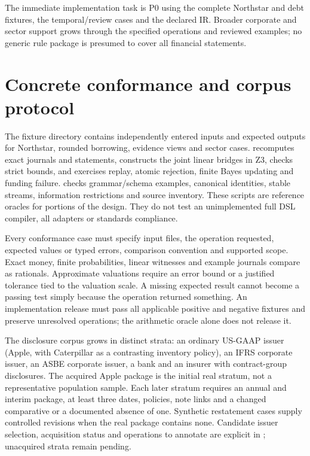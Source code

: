 The immediate implementation task is P0 using the complete Northstar and debt
fixtures, the temporal/review cases and the declared IR. Broader corporate and
sector support grows through the specified operations and reviewed examples;
no generic rule package is presumed to cover all financial statements.

\section{Concrete conformance and corpus protocol}

The fixture directory contains independently entered inputs and expected
outputs for Northstar, rounded borrowing, evidence views and sector cases.
 recomputes exact journals and statements,
constructs the joint linear bridges in Z3, checks strict bounds, and exercises
replay, atomic rejection, finite Bayes updating and funding failure.
 checks grammar/schema examples, canonical
identities, stable streams, information restrictions and source inventory.
These scripts are reference oracles for portions of the design. They do not
test an unimplemented full DSL compiler, all adapters or standards compliance.

Every conformance case must specify input files, the operation requested,
expected values or typed errors, comparison convention and supported scope.
Exact money, finite probabilities, linear witnesses and example journals
compare as rationals. Approximate valuations require an error bound or a
justified tolerance tied to the valuation scale. A missing expected result
cannot become a passing test simply because the operation returned something.
An implementation release must pass all applicable positive and negative
fixtures and preserve unresolved operations; the arithmetic oracle alone
does not release it.

The disclosure corpus grows in distinct strata: an ordinary US-GAAP issuer
(Apple, with Caterpillar as a contrasting inventory policy), an IFRS corporate
issuer, an ASBE corporate issuer, a bank and an insurer with contract-group
disclosures. The acquired Apple package is the initial real stratum, not a
representative population sample. Each later stratum requires an annual and
interim package, at least three dates, policies, note links and a changed
comparative or a documented absence of one. Synthetic restatement cases supply
controlled revisions when the real package contains none. Candidate issuer
selection, acquisition status and operations to annotate are explicit in
; unacquired strata remain pending.

